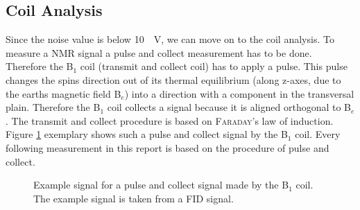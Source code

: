 \subsection{Coil Analysis}
\label{sec:CoilAnalyssis}
Since the noise value is below \SI{10}{\mu \volt}, we can move on to the coil analysis.
To measure a NMR signal a pulse and collect measurement has to be done.
Therefore the B$_1$ coil (transmit and collect coil) has to apply a pulse.
This pulse changes the spins direction out of its thermal equilibrium (along z-axes, due to the earths magnetic field B$_e$) into a direction with a component in the transversal plain.
Therefore the B$_1$ coil collects a signal because it is aligned orthogonal to B$_e$.
The transmit and collect procedure is based on \textsc{Faraday}'s law of induction.
Figure \ref{fig: PulsandcollectValesignal} exemplary shows such a pulse and collect signal by the B$_1$ coil.
Every following measurement in this report is based on the procedure of pulse and collect.

\begin{figure}[H]
    \centering
    
    \caption[Example signal for a pulse and collect signal made by the B$_1$ coil.]{Example signal for a pulse and collect signal made by the B$_1$ coil.
    The example signal is taken from a FID signal.}
    \label{fig: PulsandcollectValesignal}
\end{figure}

